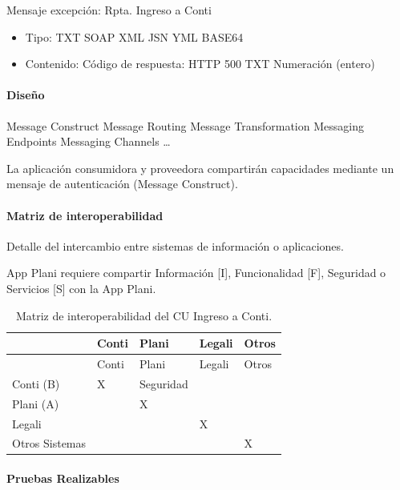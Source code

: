 \documentclass[
  paper=a4,
  ,captions=tableheading
]{scrartcl}
\providecommand{\tightlist}{%
  \setlength{\itemsep}{0pt}\setlength{\parskip}{0pt}}
\begin{document}
Mensaje excepción: Rpta. Ingreso a Conti

\begin{itemize}
\tightlist
\item
  Tipo: TXT \textbar{} SOAP \textbar{} XML \textbar{} JSN \textbar{} YML
  \textbar{} BASE64
\item
  Contenido: Código de respuesta: HTTP 500 \textbar{} TXT \textbar{}
  Numeración (entero)
\end{itemize}

\paragraph{Diseño}\label{sec:diseuxf1o-5}

Message Construct \textbar{} Message Routing \textbar{} Message
Transformation \textbar{} Messaging Endpoints \textbar{} Messaging
Channels \textbar{} \ldots{}

La aplicación consumidora y proveedora compartirán capacidades mediante
un mensaje de autenticación (Message Construct).

\paragraph{Matriz de
interoperabilidad}\label{sec:matriz-de-interoperabilidad-5}

Detalle del intercambio entre sistemas de información o aplicaciones.

App Plani requiere compartir Información {[}I{]}, Funcionalidad {[}F{]},
Seguridad o Servicios {[}S{]} con la App Plani.

\begin{longtable}[]{@{}lllll@{}}
\caption{Matriz de interoperabilidad del CU Ingreso a
Conti.}\tabularnewline
\toprule\noalign{}
& Conti & Plani & Legali & Otros \\
\midrule\noalign{}
\endfirsthead
\toprule\noalign{}
& Conti & Plani & Legali & Otros \\
\midrule\noalign{}
\endhead
\bottomrule\noalign{}
\endlastfoot
Conti (B) & X & Seguridad & & \\
Plani (A) & & X & & \\
Legali & & & X & \\
Otros Sistemas & & & & X \\
\end{longtable}

\paragraph{Pruebas Realizables}\label{sec:pruebas-realizables-5}
\end{document}
